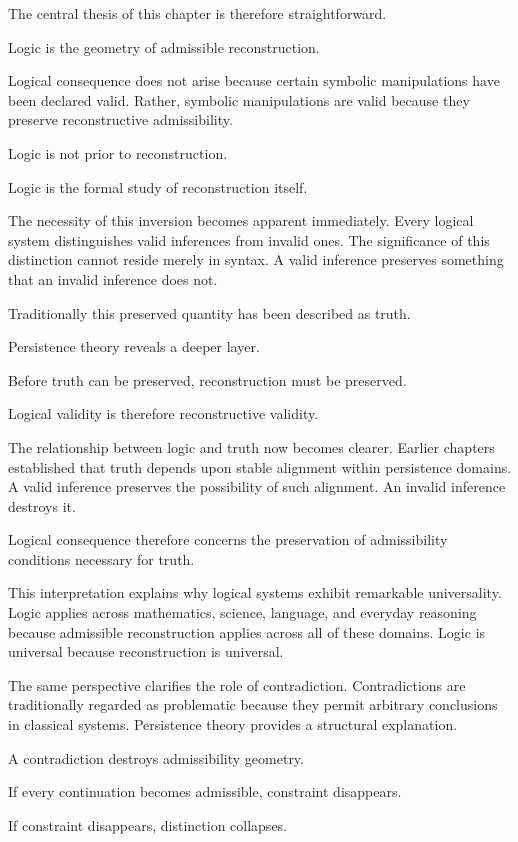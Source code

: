 \documentclass[12pt,oneside]{article}
\theoremstyle{definition}
\begin{document}
The central thesis of this chapter is therefore straightforward.

Logic is the geometry of admissible reconstruction.

Logical consequence does not arise because certain symbolic manipulations have been declared valid. Rather, symbolic manipulations are valid because they preserve reconstructive admissibility.

Logic is not prior to reconstruction.

Logic is the formal study of reconstruction itself.

The necessity of this inversion becomes apparent immediately. Every logical system distinguishes valid inferences from invalid ones. The significance of this distinction cannot reside merely in syntax. A valid inference preserves something that an invalid inference does not.

Traditionally this preserved quantity has been described as truth.

Persistence theory reveals a deeper layer.

Before truth can be preserved, reconstruction must be preserved.

Logical validity is therefore reconstructive validity.

The relationship between logic and truth now becomes clearer. Earlier chapters established that truth depends upon stable alignment within persistence domains. A valid inference preserves the possibility of such alignment. An invalid inference destroys it.

Logical consequence therefore concerns the preservation of admissibility conditions necessary for truth.

This interpretation explains why logical systems exhibit remarkable universality. Logic applies across mathematics, science, language, and everyday reasoning because admissible reconstruction applies across all of these domains. Logic is universal because reconstruction is universal.

The same perspective clarifies the role of contradiction. Contradictions are traditionally regarded as problematic because they permit arbitrary conclusions in classical systems. Persistence theory provides a structural explanation.

A contradiction destroys admissibility geometry.

If every continuation becomes admissible, constraint disappears.

If constraint disappears, distinction collapses.
\end{document}
